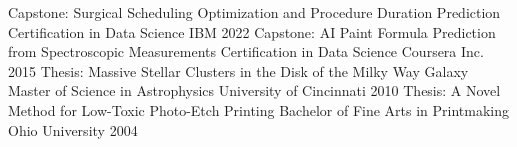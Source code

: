 \begin{cventries}
  \cvshortentry
    {Capstone: Surgical Scheduling Optimization and Procedure Duration Prediction} %
    {Certification in Data Science} %
    {IBM} %
    {2022} %
  \cvshortentry
    {Capstone: AI Paint Formula Prediction from Spectroscopic Measurements} %
    {Certification in Data Science} %
    {Coursera Inc.} %
    {2015} %
  \cvshortentry
    {Thesis: Massive Stellar Clusters in the Disk of the Milky Way Galaxy} %
    {Master of Science in Astrophysics} %
    {University of Cincinnati} %
    {2010} %
  \cvshortentry
    {Thesis: A Novel Method for Low-Toxic Photo-Etch Printing} %
    {Bachelor of Fine Arts in Printmaking} %
    {Ohio University} %
    {2004} %
\end{cventries}